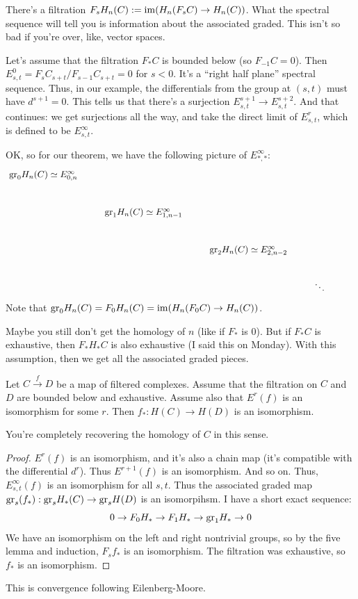 There's a filtration $F_s H_n(C):=\operatorname{im}(H_n(F_s C) \to H_n(C))$.
What the spectral sequence will tell you is information about the associated graded.
This isn't so bad if you're over, like, vector spaces.

Let's assume that the filtration $F_\ast C$ is bounded below (so $F_{-1} C = 0$).
Then $E^0_{s,t} = F_s C_{s+t}/F_{s-1} C_{s+t} = 0$ for $s<0$.
It's a ``right half plane'' spectral sequence.
Thus, in our example, the differentials from the group at $(s,t)$ must have $d^{s+1} = 0$.
This tells us that there's a surjection $E^{s+1}_{s,t} \to E^{s+2}_{s,t}$.
And that continues: we get surjections all the way, and take the direct limit of $E^{r}_{s,t}$, which is defined to be $E^\infty_{s,t}$.

OK, so for our theorem, we have the following picture of $E^\infty_{\ast,\ast}$:
\begin{equation*}
    \xymatrix{
	\gr_0 H_n(C) \simeq E^\infty_{0,n} & & & \\
	& \gr_1 H_n(C) \simeq E^\infty_{1,n-1} & & \\
	& & \gr_2 H_n(C) \simeq E^\infty_{2,n-2} & & \\
	& & & \ddots
    }
\end{equation*}
Note that $\mathrm{gr}_0 H_n(C) = F_0 H_n(C) = \operatorname{im}(H_n(F_0 C) \to H_n(C))$.

Maybe you still don't get the homology of $n$ (like if $F_\ast$ is $0$).
But if $F_\ast C$ is exhaustive, then $F_\ast H_\ast C$ is also exhaustive (I said this on Monday).
With this assumption, then we get all the associated graded pieces.
\begin{corollary}
    Let $C\xrightarrow{f} D$ be a map of filtered complexes.
    Assume that the filtration on $C$ and $D$ are bounded below and exhaustive.
    Assume also that $E^r(f)$ is an isomorphism for some $r$.
    Then $f_\ast : H(C) \to H(D)$ is an isomorphism.
\end{corollary}
You're completely recovering the homology of $C$ in this sense.
\begin{proof}
    $E^r(f)$ is an isomorphism, and it's also a chain map (it's compatible with the differential $d^r$).
    Thus $E^{r+1}(f)$ is an isomorphism.
    And so on.
    Thus, $E^\infty_{s,t}(f)$ is an isomorphism for all $s,t$.
    Thus the associated graded map $\mathrm{gr}_s(f_\ast):\mathrm{gr}_s H_\ast(C) \to \mathrm{gr}_s H(D)$ is an isomorpihsm.
    I have a short exact sequence:
    $$
    0 \to F_0 H_\ast \to F_1 H_\ast \to \mathrm{gr}_1 H_\ast \to 0
    $$
    We have an isomorphism on the left and right nontrivial groups, so by the five lemma and induction, $F_s f_\ast$ is an isomorphism.
    The filtration was exhaustive, so $f_\ast$ is an isomorphism.
\end{proof}
This is convergence following Eilenberg-Moore.


